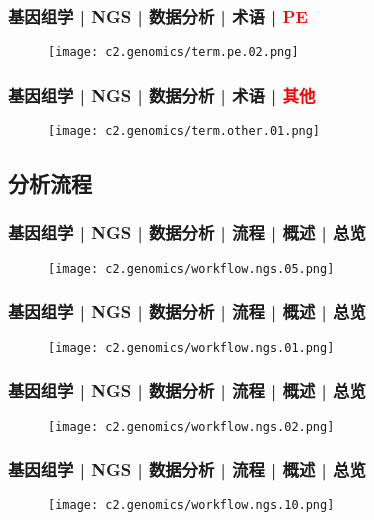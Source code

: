 \begin{frame}
  \frametitle{基因组学 | NGS | 数据分析 | 术语 | \textcolor{red}{PE}}
  \begin{figure}
    \centering
    \texttt{[image: c2.genomics/term.pe.02.png]}
  \end{figure}
\end{frame}

\begin{frame}
  \frametitle{基因组学 | NGS | 数据分析 | 术语 | \textcolor{red}{其他}}
  \begin{figure}
    \centering
    \texttt{[image: c2.genomics/term.other.01.png]}
  \end{figure}
\end{frame}

\subsection{分析流程}
\begin{frame}
  \frametitle{基因组学 | NGS | 数据分析 | 流程 | 概述 | 总览}
  \begin{figure}
    \centering
    \texttt{[image: c2.genomics/workflow.ngs.05.png]}
  \end{figure}
\end{frame}

\begin{frame}
  \frametitle{基因组学 | NGS | 数据分析 | 流程 | 概述 | 总览}
  \begin{figure}
    \centering
    \texttt{[image: c2.genomics/workflow.ngs.01.png]}
  \end{figure}
\end{frame}

\begin{frame}
  \frametitle{基因组学 | NGS | 数据分析 | 流程 | 概述 | 总览}
  \begin{figure}
    \centering
    \texttt{[image: c2.genomics/workflow.ngs.02.png]}
  \end{figure}
\end{frame}

\begin{frame}
  \frametitle{基因组学 | NGS | 数据分析 | 流程 | 概述 | 总览}
  \begin{figure}
    \centering
    \texttt{[image: c2.genomics/workflow.ngs.10.png]}
  \end{figure}
\end{frame}

